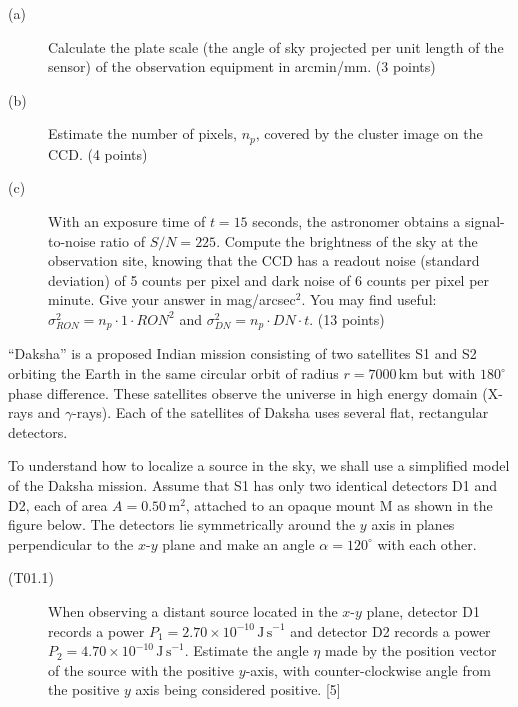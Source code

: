 \begin{description}
\item[(a)] Calculate the plate scale (the angle of sky projected per unit
  length of the sensor) of the observation equipment in arcmin/mm.
  \hfill(3 points)
\item[(b)] Estimate the number of pixels, $n_p$, covered by the cluster
  image on the CCD. \hfill(4 points)
\item[(c)] With an exposure time of $t = 15$ seconds, the astronomer obtains
  a signal-to-noise ratio of $S/N = 225$. Compute the brightness of the sky
  at the observation site, knowing that the CCD has a readout noise
  (standard deviation) of 5 counts per pixel and dark noise of 6 counts per
  pixel per minute. Give your answer in mag/arcsec$^2$. You may find useful:
  $\sigma^2_{RON} = n_p \cdot 1 \cdot RON^2$ and
  $\sigma^2_{DN} = n_p \cdot DN \cdot t$. \hfill(13 points)
\end{description}

``Daksha'' is a proposed Indian mission consisting of two satellites S1 and
S2 orbiting the Earth in the same circular orbit of radius $r = 7000$\,km but
with $180^\circ$ phase difference. These satellites observe the universe in
high energy domain (X-rays and $\gamma$-rays). Each of the satellites of
Daksha uses several flat, rectangular detectors.

To understand how to localize a source in the sky, we shall use a simplified
model of the Daksha mission. Assume that S1 has only two identical detectors
D1 and D2, each of area $A = 0.50\,\mathrm{m}^2$, attached to an opaque mount
M as shown in the figure below. The detectors lie symmetrically around the
$y$ axis in planes perpendicular to the $x$-$y$ plane and make an angle
$\alpha = 120^\circ$ with each other.


\begin{description}
\item[(T01.1)] When observing a distant source located in the $x$-$y$ plane,
  detector D1 records a power $P_1 = 2.70 \times 10^{-10}\,\mathrm{J\,s}^{-1}$
  and detector D2 records a power
  $P_2 = 4.70 \times 10^{-10}\,\mathrm{J\,s}^{-1}$. Estimate the angle $\eta$
  made by the position vector of the source with the positive $y$-axis, with
  counter-clockwise angle from the positive $y$ axis being considered
  positive. \hfill[5]
\end{description}

